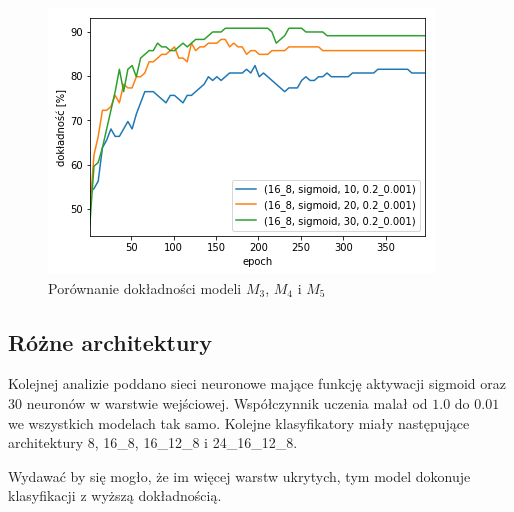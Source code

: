     \begin{figure}[htp]
        \centering
        \includegraphics[scale=0.8]{./img/feat-accuracy.png}
        \caption{Porównanie dokładności modeli $M_3$, $M_4$ i $M_5$}
    \end{figure}

    \subsection{Różne architektury}\label{subsec:różneArchitektury}

    Kolejnej analizie poddano sieci neuronowe mające funkcję aktywacji sigmoid oraz 30 neuronów w warstwie wejściowej.
    Współczynnik uczenia malał od $1.0$ do $0.01$ we wszystkich modelach tak samo.
    Kolejne klasyfikatory miały następujące architektury 8, 16\_8, 16\_12\_8 i 24\_16\_12\_8.

    Wydawać by się mogło, że im więcej warstw ukrytych, tym model dokonuje klasyfikacji z wyższą dokładnością.

